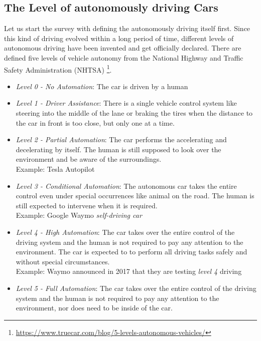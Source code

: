 \documentclass[journal]{IEEEtran}
\begin{document}
\subsection{The Level of autonomously driving Cars}
Let us start the survey with defining the autonomously driving itself first. Since this kind of driving evolved within a long period of time, different levels of autonomous driving have been invented and get officially declared. 
There are defined five levels of vehicle autonomy from the National Highway and Traffic Safety Administration (NHTSA) \footnote{\url{https://www.truecar.com/blog/5-levels-autonomous-vehicles/}}.

\begin{itemize}
\item \textit{Level 0 - No Automation}: The car is driven by a human
\item \textit{Level 1 - Driver Assistance}: There is a single vehicle control system like steering into the middle of the lane or braking the tires when the distance to the car in front is too close, but only one at a time.
 \item \textit{Level 2 - Partial Automation}: The car performs the accelerating and decelerating by itself. The human is still supposed to look over the environment and be aware of the surroundings. \\
Example: Tesla Autopilot \cite{tesla}	
\item \textit{Level 3 - Conditional Automation}: The autonomous car takes the entire control even under special occurrences like animal on the road. The human is still expected to intervene when it is required. \\
Example: Google Waymo \textit{self-driving car} \cite{google}
\item \textit{Level 4 - High Automation}: The car takes over the entire control of the driving system and the human is not required to pay any attention to the environment. The car is expected to to perform all driving tasks safely and without special circumstances. \\
Example: Waymo announced in 2017 that they are testing \textit{level 4} driving \cite{google2}
\item \textit{Level 5 - Full Automation}: The car takes over the entire control of the driving system and the human is not required to pay any attention to the environment, nor does need to be inside of the car. 
\end{itemize}
\end{document}

